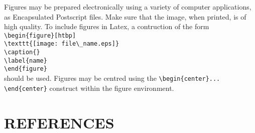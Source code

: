 \documentclass[dvips]{article}
\begin{document}
Figures may be prepared electronically using a variety of
computer applications, as Encapsulated Postscript files.
Make sure that the image, when printed, is of high quality.
To include figures in Latex, a contruction of the form\\
\verb|\begin{figure}[htbp]|\\
\verb|\texttt{[image: file\_name.eps]}|\\
\verb|\caption{}|\\
\verb|\label{name}|\\
\verb|\end{figure}|\\
should be used.
Figures may be centred
using the \verb|\begin{center}... \end{center}| construct
within the figure environment.

\section*{REFERENCES}

\begin{thebibliography}{99}


\end{thebibliography}
\end{document}
